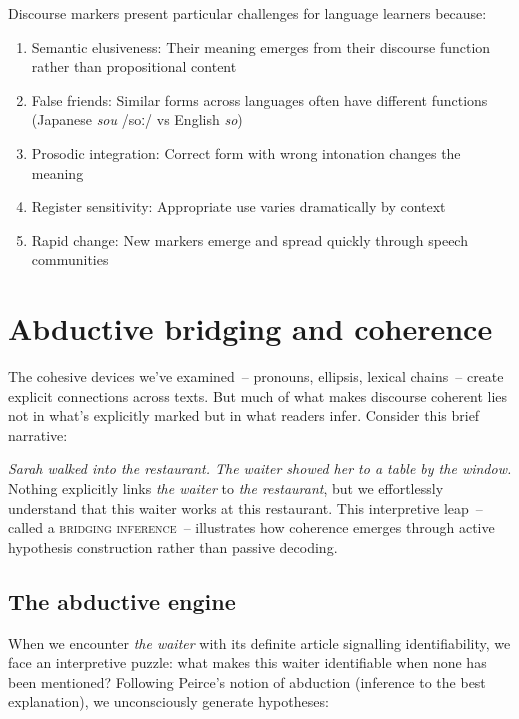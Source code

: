 Discourse markers present particular challenges for language learners because:

\begin{enumerate}[noitemsep]
   \item Semantic elusiveness: Their meaning emerges from their discourse function rather than propositional content
   \item False friends: Similar forms across languages often have different functions (Japanese \textit{sou} /soː/ vs English \textit{so})
   \item Prosodic integration: Correct form with wrong intonation changes the meaning
   \item Register sensitivity: Appropriate use varies dramatically by context
   \item Rapid change: New markers emerge and spread quickly through speech communities
\end{enumerate}

\section{Abductive bridging and coherence}\label{sec:bridging}

The cohesive devices we've examined~-- pronouns, ellipsis, lexical chains~-- create explicit connections across texts. But much of what makes discourse coherent lies not in what's explicitly marked but in what readers infer. Consider this brief narrative:

\ea
   \textit{Sarah walked into the restaurant. The waiter showed her to a table by the window.}
\z
Nothing explicitly links \textit{the waiter} to \textit{the restaurant}, but we effortlessly understand that this waiter works at this restaurant. This interpretive leap~-- called a \textsc{bridging inference}~-- illustrates how coherence emerges through active hypothesis construction rather than passive decoding.

\subsection{The abductive engine}

When we encounter \textit{the waiter} with its definite article signalling identifiability, we face an interpretive puzzle: what makes this waiter identifiable when none has been mentioned? Following Peirce's notion of abduction (inference to the best explanation), we unconsciously generate hypotheses:

